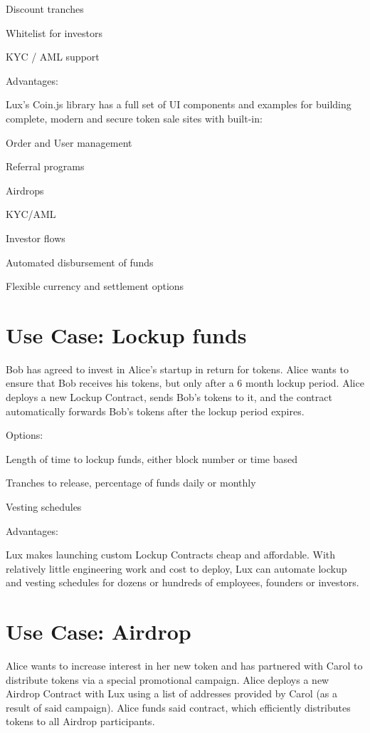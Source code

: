 \documentclass[11pt]{article}
\begin{document}
Discount tranches


Whitelist for investors


KYC / AML support


Advantages:


Lux's Coin.js library has a full set of UI components and examples for building complete, modern and secure token sale sites with built-in:


Order and User management


Referral programs


Airdrops


KYC/AML


Investor flows


Automated disbursement of funds


Flexible currency and settlement options


\section{Use Case: Lockup funds}

Bob has agreed to invest in Alice's startup in return for tokens. Alice wants to ensure that Bob receives his tokens, but only after a 6 month lockup period. Alice deploys a new Lockup Contract, sends Bob's tokens to it, and the contract automatically forwards Bob's tokens after the lockup period expires.


Options:


Length of time to lockup funds, either block number or time based


Tranches to release, percentage of funds daily or monthly


Vesting schedules


Advantages:


Lux makes launching custom Lockup Contracts cheap and affordable. With relatively little engineering work and cost to deploy, Lux can automate lockup and vesting schedules for dozens or hundreds of employees, founders or investors.


\section{Use Case: Airdrop}

Alice wants to increase interest in her new token and has partnered with Carol to distribute tokens via a special promotional campaign. Alice deploys a new Airdrop Contract with Lux using a list of addresses provided by Carol (as a result of said campaign). Alice funds said contract, which efficiently distributes tokens to all Airdrop participants.
\end{document}
